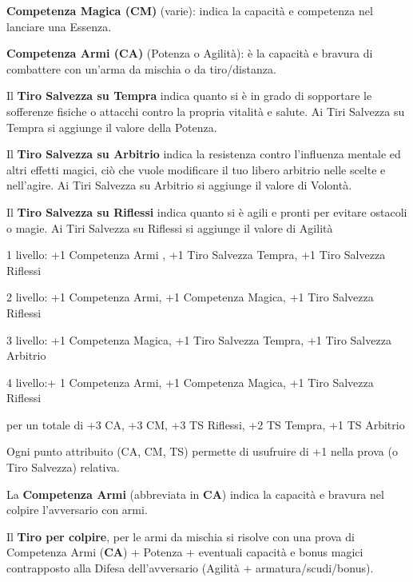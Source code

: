 \documentclass[a4paper,11pt,twoside,openany]{book}
\begin{document}
\textbf{Competenza Magica (CM)} (varie): indica la capacità e competenza nel lanciare una Essenza.

\textbf{Competenza Armi (CA)} (Potenza o Agilità): è la capacità e bravura di combattere con un'arma da mischia o da tiro/distanza.

Il \textbf{Tiro Salvezza su Tempra} indica quanto si è in grado di sopportare le sofferenze fisiche o attacchi contro la propria vitalità e salute. Ai Tiri Salvezza su Tempra si aggiunge il valore della Potenza.

Il \textbf{Tiro Salvezza su Arbitrio} indica la resistenza contro l'influenza mentale ed altri effetti magici, ciò che vuole modificare il tuo libero arbitrio nelle scelte e nell'agire. Ai Tiri Salvezza su Arbitrio si aggiunge il valore di Volontà.

Il \textbf{Tiro Salvezza su Riflessi} indica quanto si è agili e pronti per evitare ostacoli o magie. Ai Tiri Salvezza su Riflessi si aggiunge il valore di Agilità

\bigskip

\begin{tcolorbox}[title = un personaggio di quarto livello distribuisce le competenze attive in questa maniera] 

1 livello: +1 Competenza Armi , +1 Tiro Salvezza Tempra, +1 Tiro Salvezza Riflessi

2 livello: +1 Competenza Armi, +1 Competenza Magica, +1 Tiro Salvezza Riflessi

3 livello: +1 Competenza Magica, +1 Tiro Salvezza Tempra, +1 Tiro Salvezza Arbitrio

4 livello:+ 1 Competenza Armi, +1 Competenza Magica, +1 Tiro Salvezza Riflessi

per un totale di +3 CA, +3 CM, +3 TS Riflessi, +2 TS Tempra, +1 TS Arbitrio

\end{tcolorbox}


\bigskip

Ogni punto attribuito (CA, CM, TS) permette di usufruire di +1 nella prova (o Tiro Salvezza) relativa.

La \textbf{Competenza Armi} (abbreviata in \textbf{CA}) indica la capacità e bravura nel colpire l'avversario con armi.

Il \textbf{Tiro per colpire}, per le armi da mischia si risolve con una prova di Competenza Armi (\textbf{CA}) + Potenza + eventuali capacità e bonus magici contrapposto alla Difesa dell'avversario (Agilità + armatura/scudi/bonus).
\end{document}
